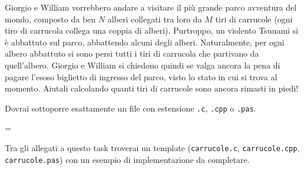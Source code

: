 \usepackage{xcolor}
\usepackage{afterpage}
\usepackage{pifont,mdframed}
\usepackage[bottom]{footmisc}

\makeatletter
\gdef\this@inputfilename{input.txt}
\gdef\this@outputfilename{output.txt}
\makeatother

\newcommand{\inputfile}{\texttt{input.txt}}
\newcommand{\outputfile}{\texttt{output.txt}}

\newenvironment{warning}
  {\par\begin{mdframed}[linewidth=2pt,linecolor=gray]%
    \begin{list}{}{\leftmargin=1cm
                   \labelwidth=\leftmargin}\item[\Large\ding{43}]}
  {\end{list}\end{mdframed}\par}

	Giorgio e William vorrebbero andare a visitare il pi\`u grande parco avventura del mondo, composto da ben $N$ alberi collegati tra loro da $M$ tiri di carrucole (ogni tiro di carrucola collega una coppia di alberi). Purtroppo, un violento Tsunami si \`e abbattuto sul parco, abbattendo alcuni degli alberi. Naturalmente, per ogni albero abbattuto si sono persi tutti i tiri di carrucola che partivano da quell'albero. Giorgio e William si chiedono quindi se valga ancora la pena di pagare l'esoso biglietto di ingresso del parco, visto lo stato in cui si trova al momento. Aiutali calcolando quanti tiri di carrucole sono ancora rimasti in piedi!

\Implementation
Dovrai sottoporre esattamente un file con estensione \texttt{.c}, \texttt{.cpp} o \texttt{.pas}.

\begin{warning}
Tra gli allegati a questo task troverai un template (\texttt{carrucole.c}, \texttt{carrucole.cpp}, \texttt{carrucole.pas}) con un esempio di implementazione da completare.
\end{warning}

